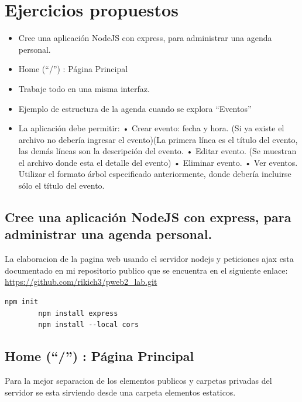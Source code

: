 \section{Ejercicios propuestos}

\begin{itemize}
    \item Cree una aplicación NodeJS con express, para administrar una agenda personal.
    \item Home (“/”) : Página Principal
    \item Trabaje todo en una misma interfaz.
    \item Ejemplo de estructura de la agenda cuando se explora “Eventos”
    \item La aplicación debe permitir:\newline
	• Crear evento: fecha y hora. (Si ya existe el archivo no debería ingresar el evento)(La primera
	línea es el título del evento, las demás líneas son la descripción del evento. \newline
	• Editar evento. (Se muestran el archivo donde esta el detalle del evento)\newline
	• Eliminar evento.\newline
	• Ver eventos. Utilizar el formato árbol especificado anteriormente, donde debería incluirse
	sólo el título del evento.
\end{itemize}

	
	\subsection*{Cree una aplicación NodeJS con express, para administrar una agenda personal.}

	La elaboracion de la pagina web usando el servidor nodejs y peticiones ajax esta documentado en mi repositorio publico
	que se encuentra en el siguiente enlace: \url{https://github.com/rikich3/pweb2_lab.git}


	\begin{lstlisting}[style=mybash]
		npm init
		npm install express
		npm install --local cors
	\end{lstlisting}
	
	\subsection{Home (“/”) : Página Principal}
	
	Para la mejor separacion de los elementos publicos y carpetas privadas del servidor se esta sirviendo desde una carpeta
	elementos estaticos.

